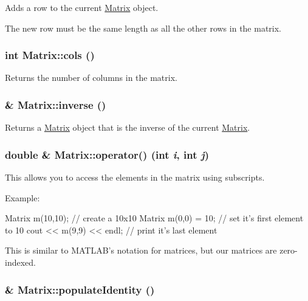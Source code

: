Adds a row to the current \hyperlink{class_matrix}{Matrix} object. 

The new row must be the same length as all the other rows in the matrix. \hypertarget{class_matrix_a35649f43610688d020b2cad91f616d51}{
\subsubsection[{cols}]{\setlength{\rightskip}{0pt plus 5cm}int Matrix::cols ()}}
\label{class_matrix_a35649f43610688d020b2cad91f616d51}


Returns the number of columns in the matrix. 

\hypertarget{class_matrix_a474b9ebea883f90ee54d963f5af8d33e}{
\subsubsection[{inverse}]{ \& Matrix::inverse ()}}
\label{class_matrix_a474b9ebea883f90ee54d963f5af8d33e}


Returns a \hyperlink{class_matrix}{Matrix} object that is the inverse of the current \hyperlink{class_matrix}{Matrix}. 

\hypertarget{class_matrix_a83a1c6c6f2f7c88a72a7ee98cae90c24}{
\subsubsection[{operator()}]{\setlength{\rightskip}{0pt plus 5cm}double \& Matrix::operator() (int {\em i}, \/  int {\em j})}}
\label{class_matrix_a83a1c6c6f2f7c88a72a7ee98cae90c24}


This allows you to access the elements in the matrix using subscripts. 

Example: 
\begin{DoxyCode}
                Matrix m(10,10);        // create a 10x10 Matrix
                m(0,0) = 10;            // set it's first element to 10
                cout << m(9,9) << endl; // print it's last element
\end{DoxyCode}
 This is similar to MATLAB's notation for matrices, but our matrices are zero-\/indexed. \hypertarget{class_matrix_a0ee71091770a4e83e54860f291ef1b7d}{
\subsubsection[{populateIdentity}]{ \& Matrix::populateIdentity ()}}
\label{class_matrix_a0ee71091770a4e83e54860f291ef1b7d}


